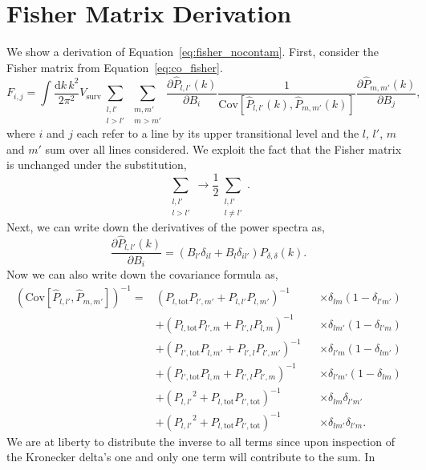\documentclass{aastex62}
\newcommand{\beq}{\begin{equation}}
\newcommand{\eeq}{\end{equation}}
\newcommand{\denps}{\ensuremath{P_{\delta,\delta}}}
\newcommand{\xps}[2]{\ensuremath{P_{#1,#2}}}
\newcommand{\pstot}[1]{\ensuremath{P_{#1,\text{tot}}}}
\newcommand{\Cov}[2]{\mathrm{Cov}[#1,#2]}
\begin{document}
\section{Fisher Matrix Derivation}\label{app:fisher_deriv}
We show a derivation of Equation~\ref{eq:fisher_nocontam}. First, consider the
Fisher matrix from Equation~\ref{eq:co_fisher}.
\beq\label{eq:co_fisher_2}
F_{i,j} = 
\int \frac{\text{d}k\,k^2}{2\pi^2} V_{\text{surv}} 
\sum_{\substack{l,l'\\l > l'}} \sum_{\substack{m,m'\\m > m'}}
\frac{\partial \hat{P}_{l,l'}(k)}{\partial B_i}
\frac{1}{\Cov{\hat{P}_{l,l'}(k)}{\hat{P}_{m,m'}(k)}} 
\frac{\partial \hat{P}_{m,m'}(k)}{\partial B_j}\text{,}
\eeq
where $i$ and $j$ each refer to a line by its upper transitional level and the
$l$, $l'$, $m$ and $m'$ sum over all lines considered. We exploit the fact
that the Fisher matrix is unchanged under the substitution,
\begin{equation*}
\sum_{\substack{l,l'\\l > l'}} \rightarrow 
\frac{1}{2} \sum_{\substack{l,l'\\l \neq l'}}\text{.}
\end{equation*}
Next, we can write down the derivatives of the power spectra as,
\beq\label{eq:psderiv}
\frac{\partial \hat{P}_{l,l'}(k)}{\partial B_i}
= \left( B_{l'} \delta_{il} + B_l\delta_{il'} \right) \denps(k)\text{.}
\eeq
Now we can also write down the covariance formula as,
\beq\label{eq:cov}
\begin{aligned}
\left(\Cov{\hat{P}_{l,l'}}{\hat{P}_{m,m'}}\right)^{-1} = 
&(\pstot{l}\xps{l'}{m'} + \xps{l}{l'}\xps{l}{m'})^{-1} &&\times \delta_{lm} (1-\delta_{l'm'}) \\
&+ (\pstot{l}\xps{l'}{m} + \xps{l'}{l}\xps{l}{m})^{-1} &&\times \delta_{lm'} (1-\delta_{l'm}) \\
&+ (\pstot{l'}\xps{l}{m'} + \xps{l'}{l}\xps{l'}{m'})^{-1} &&\times \delta_{l'm} (1-\delta_{lm'}) \\
&+ (\pstot{l'}\xps{l}{m} + \xps{l'}{l}\xps{l'}{m})^{-1} &&\times \delta_{l'm'} (1-\delta_{lm}) \\
&+ (\xps{l}{l'}^2 + \pstot{l}\pstot{l'})^{-1} &&\times \delta_{lm} \delta_{l'm'} \\
&+ (\xps{l}{l'}^2 + \pstot{l}\pstot{l'})^{-1} &&\times \delta_{lm'} \delta_{l'm}\text{.}
\end{aligned}
\eeq
We are at liberty to distribute the inverse to all terms since upon inspection
of the Kronecker delta's one and only one term will contribute to the sum. In
\end{document}
